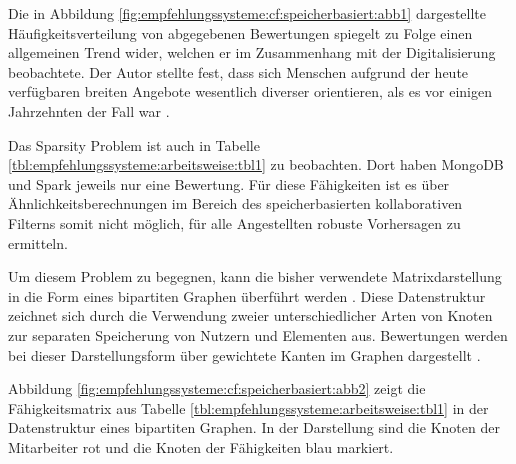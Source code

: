Die in Abbildung \ref{fig:empfehlungssysteme:cf:speicherbasiert:abb1} dargestellte Häufigkeitsverteilung von abgegebenen Bewertungen spiegelt \textcite[S. 1ff.]{anderson:2007} zu Folge einen allgemeinen Trend wider, welchen er im Zusammenhang mit der Digitalisierung beobachtete. Der Autor stellte fest, dass sich Menschen aufgrund der heute verfügbaren breiten Angebote wesentlich diverser orientieren, als es vor einigen Jahrzehnten der Fall war \cite[S. 1ff.]{anderson:2007}.

Das Sparsity Problem ist auch in Tabelle \ref{tbl:empfehlungssysteme:arbeitsweise:tbl1} zu beobachten. Dort haben MongoDB und Spark jeweils nur eine Bewertung. Für diese Fähigkeiten ist es über Ähnlichkeitsberechnungen im Bereich des speicherbasierten kollaborativen Filterns somit nicht möglich, für alle Angestellten robuste Vorhersagen zu ermitteln.

Um diesem Problem zu begegnen, kann die bisher verwendete Matrixdarstellung in die Form eines bipartiten Graphen überführt werden \cite[S. 2f.]{huang:2004}. Diese Datenstruktur zeichnet sich durch die Verwendung zweier unterschiedlicher Arten von Knoten zur separaten Speicherung von Nutzern und Elementen aus. Bewertungen werden bei dieser Darstellungsform über gewichtete Kanten im Graphen dargestellt \cite[S. 1f.]{cao:2021}.

Abbildung \ref{fig:empfehlungssysteme:cf:speicherbasiert:abb2} zeigt die Fähigkeitsmatrix aus Tabelle \ref{tbl:empfehlungssysteme:arbeitsweise:tbl1} in der Datenstruktur eines bipartiten Graphen. In der Darstellung sind die Knoten der Mitarbeiter rot und die Knoten der Fähigkeiten blau markiert.

